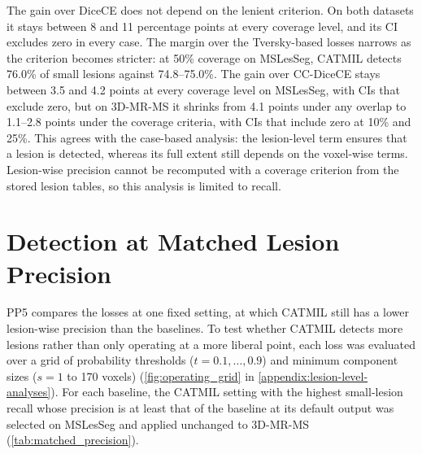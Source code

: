 The gain over DiceCE does not depend on the lenient criterion. On both
datasets it stays between 8 and 11 percentage points at every coverage
level, and its CI excludes zero in every case. The margin over the
Tversky-based losses narrows as the criterion becomes stricter: at 50\%
coverage on MSLesSeg, CATMIL detects 76.0\% of small lesions against
74.8--75.0\%. The gain over CC-DiceCE stays between 3.5 and 4.2 points at
every coverage level on MSLesSeg, with CIs that exclude zero, but on
3D-MR-MS it shrinks from 4.1 points under any overlap to 1.1--2.8 points
under the coverage criteria, with CIs that include zero at 10\% and 25\%.
This agrees with the case-based analysis: the lesion-level term ensures that a lesion is detected, whereas its
full extent still depends on the voxel-wise terms. Lesion-wise precision
cannot be recomputed with a coverage criterion from the stored lesion
tables, so this analysis is limited to recall.

\section{Detection at Matched Lesion Precision}
\label{sec:matched_precision}

PP5 compares the losses at one fixed setting, at which CATMIL still has a
lower lesion-wise precision than the baselines. To test whether CATMIL
detects more lesions rather than only operating at a more liberal point,
each loss was evaluated over a grid of probability thresholds
($t = 0.1, \dots, 0.9$) and minimum component sizes ($s = 1$ to 170
voxels) (\cref{fig:operating_grid} in \cref{appendix:lesion-level-analyses}).
For each baseline, the CATMIL setting with the highest small-lesion recall
whose precision is at least that of the baseline at its default output was
selected on MSLesSeg and applied unchanged to 3D-MR-MS
(\cref{tab:matched_precision}).

